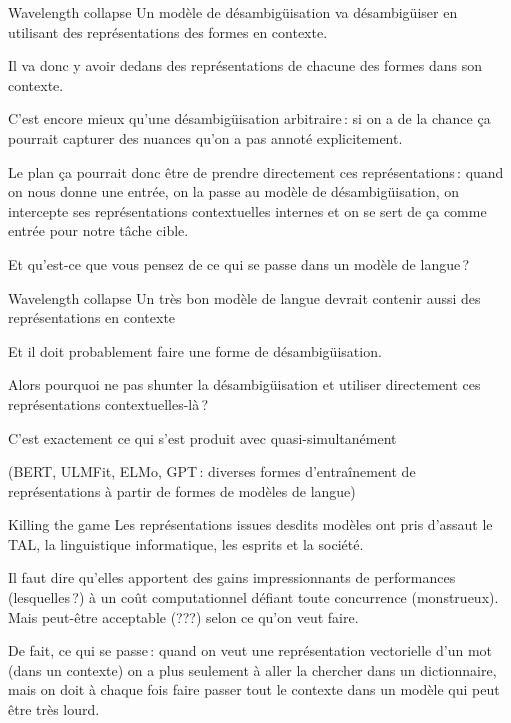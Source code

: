 \documentclass[
	xcolor={svgnames},
	aspectratio=169,
	french,
]{beamer}
\begin{document}
\begin{frame}{Wavelength collapse}
	Un modèle de désambigüisation va désambigüiser en utilisant des représentations des formes
	\alert{en contexte}.

	\pause

	Il va donc y avoir dedans des représentations de chacune des formes \alert{dans son contexte}.

	\pause

	C'est encore mieux qu'une désambigüisation arbitraire : si on a de la chance ça pourrait
	capturer des nuances qu'on a pas annoté explicitement.

	\pause

	Le plan ça pourrait donc être de prendre directement ces représentations : quand on nous donne
	une entrée, on la passe au modèle de désambigüisation, on intercepte ses représentations
	contextuelles internes et on se sert de \alert{ça} comme entrée pour notre tâche cible.

	\pause

	Et qu'est-ce que vous pensez de ce qui se passe dans un \alert{modèle de langue} ?
\end{frame}

\begin{frame}{Wavelength collapse}
	Un très bon modèle de langue devrait contenir aussi des représentations en contexte
	
	\pause
	
	Et il doit probablement faire une forme de désambigüisation.

	\pause

	Alors pourquoi ne pas shunter la désambigüisation et utiliser directement ces
	\alert{représentations contextuelles}-là ?

	\pause

	C'est exactement ce qui s'est produit avec quasi-simultanément
	\textcite{devlin2019BERTPretrainingDeep, howard2018UniversalLanguageModel,
	peters2018DeepContextualizedWord, radford2018ImprovingLanguageUnderstanding}

	(BERT, ULMFit, ELMo, GPT : diverses formes d'entraînement de représentations à partir de formes
	de modèles de langue)

\end{frame}

\begin{frame}{Killing the game}
	Les représentations issues desdits modèles ont pris d'assaut le TAL, la linguistique
	informatique, les esprits et la société.

	\pause

	Il faut dire qu'elles apportent des gains impressionnants de performances (lesquelles ?) \pause
	à un coût computationnel défiant toute concurrence \pause (monstrueux). \pause Mais peut-être
	acceptable (???) selon ce qu'on veut faire.

	\pause

	De fait, ce qui se passe : quand on veut une représentation vectorielle d'un mot (dans un
	contexte) on a plus seulement à aller la chercher dans un \alert{dictionnaire}, mais on doit à
	chaque fois faire passer tout le contexte dans un \alert{modèle} qui peut être très lourd.
 \end{frame}
\end{document}
